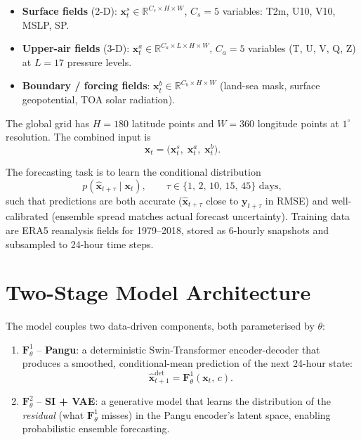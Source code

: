 \documentclass[11pt]{article}
\begin{document}
\begin{itemize}
  \item \textbf{Surface fields} (2-D):\;
        $\mathbf{x}_t^s \in \mathbb{R}^{C_s \times H \times W}$,\quad
        $C_s = 5$ variables: T2m, U10, V10, MSLP, SP.

  \item \textbf{Upper-air fields} (3-D):\;
        $\mathbf{x}_t^a \in \mathbb{R}^{C_a \times L \times H \times W}$,\quad
        $C_a = 5$ variables (T, U, V, Q, Z) at $L = 17$ pressure levels.

  \item \textbf{Boundary / forcing fields}:\;
        $\mathbf{x}_t^b \in \mathbb{R}^{C_b \times H \times W}$
        (land-sea mask, surface geopotential, TOA solar radiation).
\end{itemize}

The global grid has $H = 180$ latitude points and $W = 360$ longitude points
at $1^\circ$ resolution.  The combined input is
\begin{equation}
  \mathbf{x}_t = \bigl(\mathbf{x}_t^s,\; \mathbf{x}_t^a,\; \mathbf{x}_t^b\bigr).
\end{equation}

The forecasting task is to learn the conditional distribution
\begin{equation}
  p\!\left(\hat{\mathbf{x}}_{t+\tau} \mid \mathbf{x}_t\right),
  \qquad \tau \in \{1,\,2,\,10,\,15,\,45\}\text{ days},
\end{equation}
such that predictions are both accurate ($\hat{\mathbf{x}}_{t+\tau}$ close to
$\mathbf{y}_{t+\tau}$ in RMSE) and well-calibrated (ensemble spread matches
actual forecast uncertainty). Training data are ERA5 reanalysis fields for
1979--2018, stored as 6-hourly snapshots and subsampled to 24-hour time steps.

\section{Two-Stage Model Architecture}

The model couples two data-driven components, both parameterised by $\theta$:

\begin{enumerate}
  \item[\textbf{(A)}] $\mathbf{F}^1_\theta$ -- \textbf{Pangu}: a deterministic
        Swin-Transformer encoder-decoder that produces a smoothed,
        conditional-mean prediction of the next 24-hour state:
        \begin{equation}
          \hat{\mathbf{x}}_{t+1}^{\mathrm{det}}
          = \mathbf{F}^1_\theta(\mathbf{x}_t,\,c).
        \end{equation}

  \item[\textbf{(B)}] $\mathbf{F}^2_\theta$ -- \textbf{SI + VAE}: a generative
        model that learns the distribution of the \emph{residual} (what
        $\mathbf{F}^1_\theta$ misses) in the Pangu encoder's latent space,
        enabling probabilistic ensemble forecasting.
\end{enumerate}
\end{document}
